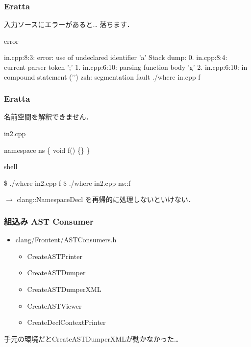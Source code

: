 \documentclass[12pt,xgraphicx=dvips,xcolor=dvips]{beamer}
\begin{document}
\begin{frame}[containsverbatim]
  \frametitle{Eratta}

  入力ソースにエラーがあると… 落ちます．

  \begin{alertblock}{error}
    \begin{semiverbatim}in.cpp:8:3: error: use of undeclared identifier 'a'
      Stack dump:
      0.	in.cpp:8:4: current parser token ';'
      1.	in.cpp:6:10: parsing function body 'g'
      2.	in.cpp:6:10: in compound statement ('{}')
      zsh: segmentation fault  ./where in.cpp f\end{semiverbatim}
  \end{alertblock}
\end{frame}

\begin{frame}[containsverbatim]
  \frametitle{Eratta}

  名前空間を解釈できません．

  \begin{alertblock}{in2.cpp}
\begin{semiverbatim}namespace ns \{
  void f() \{\}
\}\end{semiverbatim}
  \end{alertblock}

  \begin{alertblock}{shell}
\begin{semiverbatim}\$ ./where in2.cpp f
\$ ./where in2.cpp ns::f\end{semiverbatim}
  \end{alertblock}

  \vspace{.5zh}

  $\rightarrow$ clang::NamespaceDecl を再帰的に処理しないといけない．
\end{frame}

\begin{frame}[containsverbatim]
  \frametitle{組込み AST Consumer}

  \begin{itemize}
    \item clang/Frontent/ASTConsumers.h
      \begin{itemize}
        \setlength{\itemsep}{1.5zh}
        \item CreateASTPrinter
        \item CreateASTDumper
        \item CreateASTDumperXML
        \item CreateASTViewer
        \item CreateDeclContextPrinter
      \end{itemize}
  \end{itemize}

  \vspace{.5zh}

  {\small 手元の環境だとCreateASTDumperXMLが動かなかった…}
\end{frame}
\end{document}
